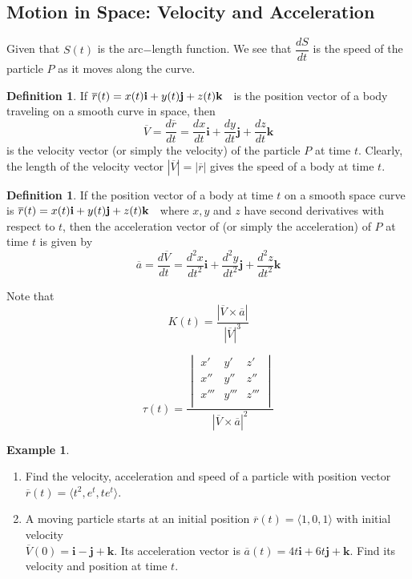 \documentclass[11pt,a4paper]{article}
\theoremstyle{definition}
\newtheorem{defn}[thm]{Definition}
\newtheorem{exa}[thm]{Example}
\begin{document}
\subsection{Motion in Space: Velocity and Acceleration}
Given that $S(t)$ is the arc$-$length function. We see that $\dfrac{dS}{dt}$ is the speed of the particle $P$ as it moves along the curve.\


\begin{defn}


If $\overline{r}(t) = x(t)\textbf{i} + y(t) \textbf{j} + z(t)\textbf{k}\hspace{0.2cm}$ is the position vector of a body traveling on a smooth curve in space, then $$\overline{V} = \frac{d\overline{r}}{dt}= \frac{dx}{dt}\textbf{i} + \frac{dy}{dt}\textbf{j} + \frac{dz}{dt}\textbf{k}$$ is the velocity vector (or simply the velocity) of the particle $P$ at time $t$. Clearly, the length of the velocity vector $\left|\overline{V}\right| = \left|\overline{r}\right|$ gives the speed of a body at time $t$.\\
\end{defn}

\begin{defn}


If the position vector of a body at time $t$ on a smooth space curve is $\overline{r}(t) = x(t)\textbf{i} + y(t) \textbf{j} + z(t)\textbf{k}\hspace{0.2cm}$ where $x, y$ and $z$ have second derivatives with respect to $t$, then the acceleration vector of (or simply the acceleration) of $P$ at time $t$ is given by $$\overline{a} = \frac{d\overline{V}}{dt} = \frac{d^2 x}{dt^2}\textbf{i} + \frac{d^2 y}{dt^2}\textbf{j} + \frac{d^2 z}{dt^2}\textbf{k}$$

Note that
$$K(t) = \frac{\left|\overline{V} \times \overline{a}\right|
}{\left|\overline{V}\right|^3
}$$


$$\tau(t) = \frac{\begin{vmatrix}
x' & y' & z'\\
x'' & y'' & z''\\
x'''  & y''' & z'''\\
\end{vmatrix}
}{\left|\overline{V} \times \overline{a}\right|^2
}$$
\end{defn}


\begin{exa}
\begin{enumerate}
\item Find the velocity, acceleration and speed of a particle with position vector $\overline{r}(t) = \big\langle t^2, e^t, te^t\big\rangle$.
\item A moving particle starts at an initial position $\overline{r}(t) = \big\langle 1, 0, 1\big\rangle$ with initial velocity\\ $\overline{V}(0) = \textbf{i} - \textbf{j} + \textbf{k}$. Its acceleration vector is $\overline{a}(t) = 4t\textbf{i} + 6t\textbf{j} + \textbf{k}$. Find its velocity and position at time $t$.
\end{enumerate}
\end{exa}
\end{document}
